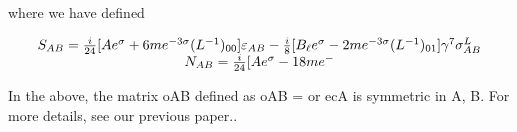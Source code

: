 \documentclass{article}
\begin{document}
where we have defined


\begin{equation}
\begin{array} { c c } { S _ { A B } = \frac { i } { 2 4 } [ A e ^ { \sigma } + 6 m e ^ { - 3 \sigma } ( L ^ { - 1 } ) _ { 0 0 } ] \varepsilon _ { A B } - \frac { i } { 8 } [ B _ { \ell } e ^ { \sigma } - 2 m e ^ { - 3 \sigma } ( L ^ { - 1 } ) _ { 0 1 } ] \gamma ^ { 7 } \sigma _ { A B } ^ { L } } \\ { N _ { A B } = \frac { i } { 2 4 } [ A e ^ { \sigma } - 1 8 m e ^ { -}}\end{array}
\end{equation}


In the above, the matrix oAB defined as oAB = or ecA is symmetric in A, B. For more
details, see our previous paper..
\end{document}
